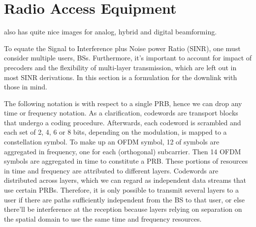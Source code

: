 \section{Radio Access Equipment}
\label{sec:radio_access_equipment}



\cite{phdthesis} also has quite nice images for analog, hybrid and digital beamforming.






To equate the Signal to Interference plus Noise power Ratio (\acs{SINR}), one must consider multiple users, \acp{BS}. Furthermore, it's important to account for impact of precoders and the flexibility of multi-layer transmission, which are left out in most \acs{SINR} derivations. In this section is a formulation for the downlink with those in mind.

The following notation is with respect to a single \acs{PRB}, hence we can drop any time or frequency notation.
As a clarification, codewords are transport blocks that undergo a coding procedure. Afterwards, each codeword is scrambled and each set of 2, 4, 6 or 8 bits, depending on the modulation, is mapped to a constellation symbol. To make up an \acs{OFDM} symbol, 12 of symbols are aggregated in frequency, one for each (orthogonal) subcarrier. Then 14 \acs{OFDM} symbols are aggregated in time to constitute a \acl{PRB}. These portions of resources in time and frequency are attributed to different layers. Codewords are distributed across layers, which we can regard as independent data streams that use certain \acsp{PRB}. Therefore, it is only possible to transmit several layers to a user if there are paths sufficiently independent from the \acs{BS} to that user, or else there'll be interference at the reception because layers relying on separation on the spatial domain to use the same time and frequency resources.

